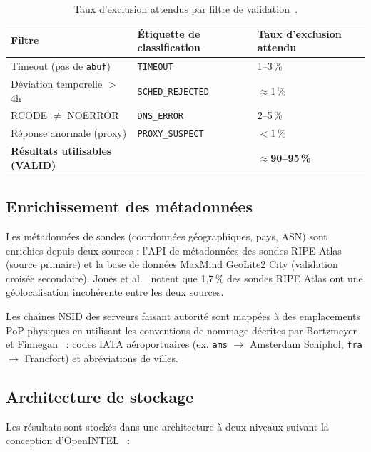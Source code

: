 \begin{table}[H]
\centering
\small
\begin{tabular}{l l l}
\toprule
\textbf{Filtre} & \textbf{Étiquette de classification} & \textbf{Taux d'exclusion attendu} \\
\midrule
Timeout (pas de \texttt{abuf})       & \texttt{TIMEOUT}          & 1--3\,\%             \\
Déviation temporelle $>$4h           & \texttt{SCHED\_REJECTED}  & $\approx$1\,\%       \\
RCODE $\neq$ NOERROR             & \texttt{DNS\_ERROR}       & 2--5\,\%             \\
Réponse anormale (proxy)  & \texttt{PROXY\_SUSPECT}   & $<$1\,\%             \\
\midrule
\textbf{Résultats utilisables (VALID)}  &                           & \textbf{$\approx$90--95\,\%} \\
\bottomrule
\end{tabular}
\caption{Taux d'exclusion attendus par filtre de validation~\cite{Holterbach2015,Jones2016,Nosyk2024}.}
\label{tab:filter_rates}
\end{table}

\subsection{Enrichissement des métadonnées}
\label{subsec:3.4.4}

Les métadonnées de sondes (coordonnées géographiques, pays, ASN) sont enrichies depuis deux sources : l'API de métadonnées des sondes RIPE Atlas (source primaire) et la base de données MaxMind GeoLite2 City (validation croisée secondaire). Jones et al.~\cite{Jones2016} notent que 1,7\,\% des sondes RIPE Atlas ont une géolocalisation incohérente entre les deux sources.

Les chaînes NSID des serveurs faisant autorité sont mappées à des emplacements PoP physiques en utilisant les conventions de nommage décrites par Bortzmeyer~\cite{Bortzmeyer2013} et Finnegan~\cite{Finnegan2018} : codes IATA aéroportuaires (ex. \texttt{ams} $\rightarrow$ Amsterdam Schiphol, \texttt{fra} $\rightarrow$ Francfort) et abréviations de villes.

\subsection{Architecture de stockage}
\label{subsec:3.4.5}

Les résultats sont stockés dans une architecture à deux niveaux suivant la conception d'OpenINTEL~\cite{vanRijswijk2016} :

